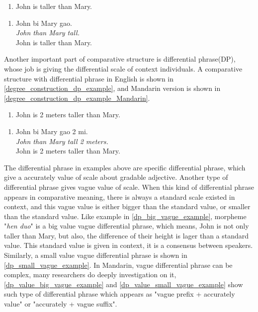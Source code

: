 \documentclass{ctexart}
\let \cite \parencite
\begin{document}
\begin{enumerate}
    \item \label{degree_construction_example}
    John is taller than Mary.
\end{enumerate}

\begin{enumerate}[resume]
    \item \label{degree_construction_example_Mandarin}
    John bi Mary gao.  \\
    \textit{John than Mary tall.} \\
    John is taller than Mary.
\end{enumerate}

Another important part of comparative structure is differential phrase(DP), whose job is giving the differential scale of context individuals. A comparative structure with differential phrase in English is shown in \ref{degree_construction_dp_example}, and Mandarin version is shown in \ref{degree_construction_dp_example_Mandarin}.

\begin{enumerate}[resume]
    \item \label{degree_construction_dp_example}
    John is 2 meters taller than Mary.
\end{enumerate}

\begin{enumerate}[resume]
    \item \label{degree_construction_dp_example_Mandarin}
    John bi Mary gao 2 mi.  \\
    \textit{John than Mary tall 2 meters.} \\
    John is 2 meters taller than Mary.
\end{enumerate}

The differential phrase in examples above are specific differential phrase, which give a accurately value of scale about gradable adjective. Another type of differential phrase gives vague value of scale. When this kind of differential phrase appears in comparative meaning, there is always a standard scale existed in context, and this vague value is either bigger than the standard value, or smaller than the standard value. Like example in \ref{dp_big_vague_example}, morpheme "\textit{hen duo}" is a big value vague differential phrase, which means, John is not only taller than Mary, but also, the difference of their height is lager than a standard value. This standard value is given in context, it is a consensus between speakers. Similarly, a small value vague differential phrase is shown in \ref{dp_small_vague_example}. In Mandarin, vague differential phrase can be complex, many researchers \cite{lin2014,li2015} do deeply investigation on it, \ref{dp_value_big_vague_example} and \ref{dp_value_small_vague_example} show such type of differential phrase which appears as "vague prefix + accurately value" or "accurately + vague suffix".
\end{document}
